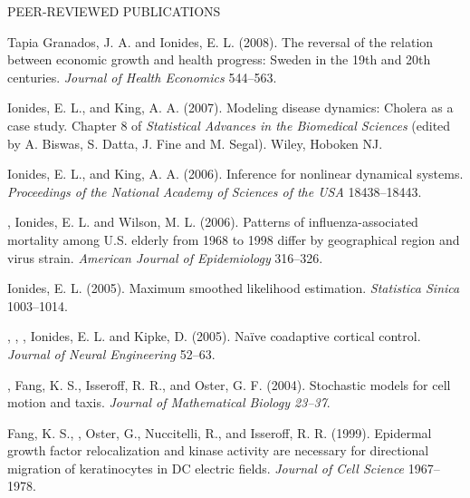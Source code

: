 \begin{reflist}{PEER-REVIEWED PUBLICATIONS}
\item\formal{[[\tapiaJHE] ]} 
Tapia Granados, J. A. and Ionides, E. L. (2008). The reversal of the relation between economic growth and health progress: Sweden in the 19th and 20th centuries. {\em Journal of Health Economics} {}{\separator}544--563.

\item\formal{[[\ionidesBOOK] ]}  
Ionides, E. L.,  and King, A. A. (2007). 
 Modeling disease dynamics: Cholera as a case study.
 Chapter 8 of {\em  Statistical Advances in the Biomedical Sciences} (edited by A. Biswas, S. Datta, J. Fine and M. Segal). Wiley, Hoboken NJ.


\item\formal{[[\ionidesPNAS] ]}  
Ionides, E. L.,  and King, A. A. (2006). 
 Inference for nonlinear dynamical systems.
 {\em Proceedings of the National Academy of Sciences of the USA} {}{\separator}18438--18443.


\item\formal{[[\greeneAJE] ]} 
, Ionides, E. L. and Wilson,
  M. L. (2006). Patterns of influenza-associated mortality among
  U.S. elderly from 1968 to 1998 differ by geographical region
  and virus strain. {\em American Journal of
  Epidemiology} {}{\separator}316--326. 


\item\formal{[[\ionidesSINICA] ]} 
Ionides, E. L. (2005). Maximum smoothed likelihood estimation.
 {\em Statistica Sinica} {}{\separator}1003--1014.


\item\formal{[[\gageJNE] ]}  
,  , 
   , Ionides, E. L. and
  Kipke, D. (2005). Na\"{i}ve coadaptive cortical control. 
  {\em Journal of Neural Engineering} {}{\separator}52--63. 


\item\formal{[[\ionidesJMB] ]}  
 ,  Fang, K. S.,  Isseroff, R. R., and  Oster, G. F. (2004).  Stochastic models for cell motion and taxis. {\em
 Journal of Mathematical Biology {}{\separator}23--37}.


\item\formal{[[\fangJCS] ]}  
 Fang, K. S.,  ,  Oster, G.,  
Nuccitelli, R.,   and Isseroff, R. R. (1999). Epidermal growth factor 
relocalization and kinase activity are necessary for directional
migration of keratinocytes in DC electric fields. 
{\em Journal of Cell Science} {}{\separator}1967--1978.
\end{reflist}


